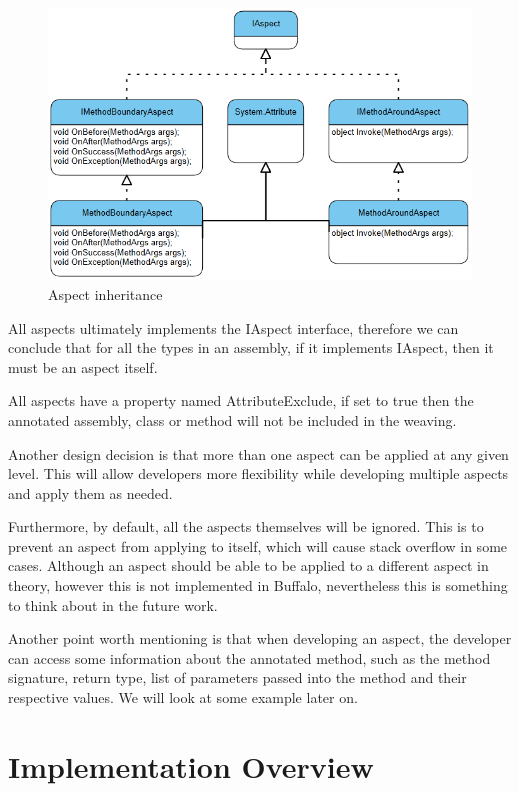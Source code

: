 \begin{figure}[here]
  \includegraphics[scale=1.0]{Uml01.PNG}
  \centering
  \caption{Aspect inheritance\label{uml01}}
\end{figure}

All aspects ultimately implements the IAspect interface, therefore we can conclude that for all the types in an assembly, if it implements IAspect, then it must be an aspect itself.

All aspects have a property named AttributeExclude, if set to true then the annotated assembly, class or method will not be included in the weaving.

Another design decision is that more than one aspect can be applied at any given level. This will allow developers more flexibility while developing multiple aspects and apply them as needed.

Furthermore, by default, all the aspects themselves will be ignored. This is to prevent an aspect from applying to itself, which will cause stack overflow in some cases. Although an aspect should be able to be applied to a different aspect in theory, however this is not implemented in Buffalo, nevertheless this is something to think about in the future work.

Another point worth mentioning is that when developing an aspect, the developer can access some information about the annotated method, such as the method signature, return type, list of parameters passed into the method and their respective values. We will look at some example later on.

\section{Implementation Overview}

